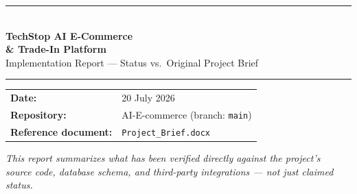 \documentclass[11pt,a4paper]{article}
\begin{document}
\begin{titlepage}
\thispagestyle{empty}
\begin{center}
\vspace*{1.5cm}
{\color{Accent}\rule{\textwidth}{2pt}}\\[0.7cm]
{\Huge\bfseries\color{Accent} TechStop AI E-Commerce \\[0.2cm] \& Trade-In Platform}\\[0.7cm]
{\Large\color{GrayText} Implementation Report --- Status vs.\ Original Project Brief}\\[1cm]
{\color{Accent}\rule{\textwidth}{2pt}}
\end{center}

\vspace{2.5cm}

\begin{center}
\begin{tcolorbox}[
  colback=AccentLight, colframe=Accent, boxrule=0.6pt, arc=2mm,
  width=0.72\textwidth, left=14pt, right=14pt, top=10pt, bottom=10pt
]
\begin{tabular}{@{}ll@{}}
\textbf{Date:} & 20 July 2026 \\[3pt]
\textbf{Repository:} & AI-E-commerce (branch: \texttt{main}) \\[3pt]
\textbf{Reference document:} & \texttt{Project\_Brief.docx} \\
\end{tabular}
\end{tcolorbox}
\end{center}

\vfill

\begin{center}
{\small\color{GrayText}\itshape
This report summarizes what has been verified directly against the project's\\
source code, database schema, and third-party integrations --- not just claimed status.}
\end{center}

\vspace{1cm}

\end{titlepage}

\pagestyle{plain}
\tableofcontents
\newpage
\pagestyle{fancy}
\end{document}
